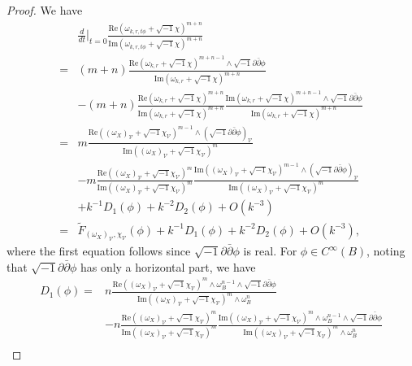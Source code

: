 \documentclass{amsart}
\numberwithin{equation}{section}
\theoremstyle{plain}
\theoremstyle{definition}
\theoremstyle{remark}
\begin{document}
\begin{proof}
    We have
    \begin{align*}
        &\frac{d}{dt}\Big|_{t = 0}\frac{\mathrm{Re}(\omega_{k,r,t\phi}+\sqrt{-1}\chi)^{m+n}}{\mathrm{Im}(\omega_{k,r,t\phi}+\sqrt{-1}\chi)^{m+n}}\\
        =&(m+n)\frac{\mathrm{Re}(\omega_{k,r}+\sqrt{-1}\chi)^{m+n-1}\wedge\sqrt{-1}\partial\bar{\partial}\phi}{\mathrm{Im}(\omega_{k,r}+\sqrt{-1}\chi)^{m+n}}\\
        &-(m+n)\frac{\mathrm{Re}(\omega_{k,r}+\sqrt{-1}\chi)^{m+n}}{\mathrm{Im}(\omega_{k,r}+\sqrt{-1}\chi)^{m+n}}\frac{\mathrm{Im}(\omega_{k,r}+\sqrt{-1}\chi)^{m+n-1}\wedge\sqrt{-1}\partial\bar{\partial}\phi}{\mathrm{Im}(\omega_{k,r}+\sqrt{-1}\chi)^{m+n}}\\
        =&m\frac{\mathrm{Re}((\omega_X)_\mathcal{V}+\sqrt{-1}\chi_\mathcal{V})^{m-1}\wedge(\sqrt{-1}\partial\bar{\partial}\phi)_\mathcal{V}}{\mathrm{Im}((\omega_X)_\mathcal{V}+\sqrt{-1}\chi_\mathcal{V})^m}\\
        &-m\frac{\mathrm{Re}((\omega_X)_\mathcal{V}+\sqrt{-1}\chi_\mathcal{V})^m}{\mathrm{Im}((\omega_X)_\mathcal
        V+\sqrt{-1}\chi_\mathcal{V})^m}\frac{\mathrm{Im}((\omega_X)_\mathcal{V}+\sqrt{-1}\chi_\mathcal{V})^{m-1}\wedge(\sqrt{-1}\partial\bar{\partial}\phi)_\mathcal{V}}{\mathrm{Im}((\omega_X)_\mathcal{V}+\sqrt{-1}\chi_\mathcal{V})^m}\\
        &+k^{-1}D_1(\phi)+k^{-2}D_2(\phi)+O(k^{-3})\\
        =&\tilde{F}_{(\omega_X)_\mathcal{V},\chi_\mathcal{V}}(\phi)+k^{-1}D_1(\phi)+k^{-2}D_2(\phi)+O(k^{-3}),
    \end{align*}
    where the first equation follows since $\sqrt{-1}\partial\bar{\partial}\phi$ is real.
    For $\phi\in C^\infty(B)$, noting that $\sqrt{-1}\partial\bar{\partial}\phi$ has only a horizontal part, 
    we have
    \begin{align*}
        D_1(\phi)
        =&n\frac{\mathrm{Re}((\omega_X)_\mathcal{V}+\sqrt{-1}\chi_\mathcal{V})^m\wedge\omega_B^{n-1}\wedge\sqrt{-1}\partial\bar{\partial}\phi}{\mathrm{Im}((\omega_X)_\mathcal{V}+\sqrt{-1}\chi_\mathcal{V})^m\wedge\omega_B^n}\\
        &-n\frac{\mathrm{Re}((\omega_X)_\mathcal{V}+\sqrt{-1}\chi_\mathcal{V})^m}{\mathrm{Im}((\omega_X)_\mathcal{V}+\sqrt{-1}\chi_\mathcal{V})^m}\frac{\mathrm{Im}((\omega_X)_\mathcal{V}+\sqrt{-1}\chi_\mathcal{V})^m\wedge\omega_B^{n-1}\wedge\sqrt{-1}\partial\bar{\partial}\phi}{\mathrm{Im}((\omega_X)_\mathcal{V}+\sqrt{-1}\chi_\mathcal{V})^m\wedge\omega_B^n}\\

\end{align*}
\end{proof}
\end{document}
